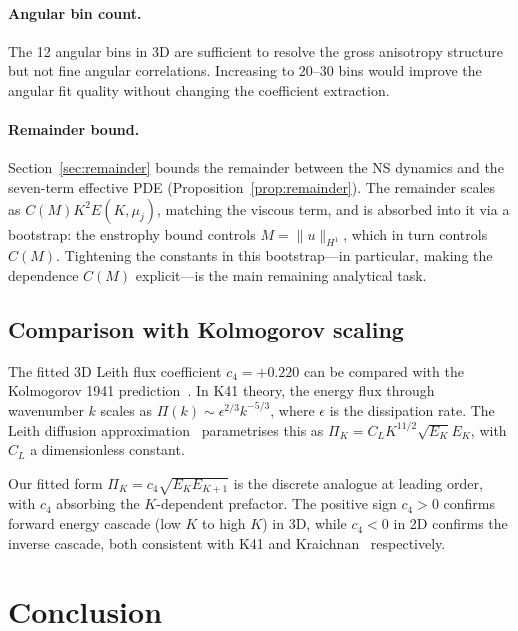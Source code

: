 \documentclass[11pt,a4paper]{article}
\theoremstyle{remark}
\begin{document}
\paragraph{Angular bin count.}  The 12 angular bins in 3D are sufficient to resolve the gross anisotropy structure but not fine angular correlations.  Increasing to 20--30 bins would improve the angular fit quality without changing the coefficient extraction.

\paragraph{Remainder bound.}  Section~\ref{sec:remainder} bounds the remainder between the NS dynamics and the seven-term effective PDE (Proposition~\ref{prop:remainder}).  The remainder scales as $C(M) K^2 E(K,\mu_j)$, matching the viscous term, and is absorbed into it via a bootstrap: the enstrophy bound controls $M = \|u\|_{H^1}$, which in turn controls $C(M)$.  Tightening the constants in this bootstrap---in particular, making the dependence $C(M)$ explicit---is the main remaining analytical task.

\subsection{Comparison with Kolmogorov scaling}

The fitted 3D Leith flux coefficient $c_4 = +0.220$ can be compared with the Kolmogorov 1941 prediction~\cite{kolmogorov1941}.  In K41 theory, the energy flux through wavenumber $k$ scales as $\Pi(k) \sim \epsilon^{2/3} k^{-5/3}$, where $\epsilon$ is the dissipation rate.  The Leith diffusion approximation~\cite{leith1967} parametrises this as $\Pi_K = C_L K^{11/2} \sqrt{E_K} E_K$, with $C_L$ a dimensionless constant.

Our fitted form $\Pi_K = c_4 \sqrt{E_K E_{K+1}}$ is the discrete analogue at leading order, with $c_4$ absorbing the $K$-dependent prefactor.  The positive sign $c_4 > 0$ confirms forward energy cascade (low $K$ to high $K$) in 3D, while $c_4 < 0$ in 2D confirms the inverse cascade, both consistent with K41 and Kraichnan~\cite{kraichnan1967} respectively.


\section{Conclusion}\label{sec:conclusion}
\end{document}
